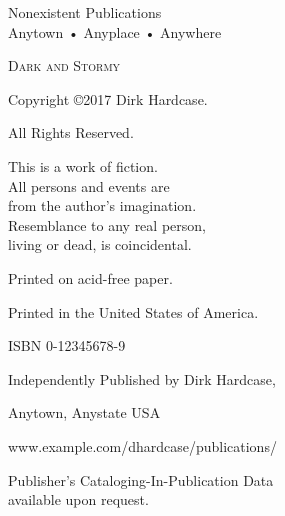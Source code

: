 \documentclass{novel} %
\begin{document}
\frontmatter

\thispagestyle{empty}
\vspace*{6\nbs}
\hfill{}\par
\vspace{\nbs}
\hfill{}\par
\clearpage

\thispagestyle{empty}
\null
\clearpage

\thispagestyle{empty}
\vspace*{5\nbs}
\begin{center}
\par
\vspace{2\nbs}
\par
\vspace{1.5\nbs}
\par
\vspace{4\nbs}
\vspace{4\nbs}
{\theAuthor}
\vfill
{ Nonexistent Publications\\
Anytown • Anyplace • Anywhere}\par

\end{center}
\clearpage


\thispagestyle{empty}
\begin{center}
\itshape{
\null
\vfill
\textsc{Dark and Stormy}\par
Copyright ©2017 Dirk Hardcase.\par %
All Rights Reserved.\par %
\null
This is a work of fiction.\\
All persons and events are\\
from the author's imagination.\\
Resemblance to any real person,\\
living or dead, is coincidental.\par %
\null
Printed on acid-free paper.\par %
Printed in the United States of America.\par %
\null
ISBN 0-12345678-9\par %
\null

Independently Published by Dirk Hardcase,\par %
Anytown, Anystate USA\par %
www.example.com/dhardcase/publications/\par %
\null
Publisher's Cataloging-In-Publication Data\\
available upon request.\par
} %
\end{center}
\clearpage
\end{document}
